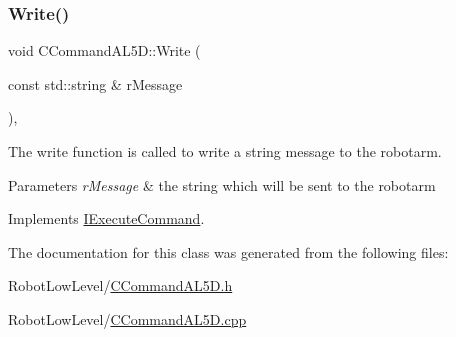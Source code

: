 \subsubsection{\texorpdfstring{Write()}{Write()}}
{\footnotesize\ttfamily void C\+Command\+A\+L5\+D\+::\+Write (\begin{DoxyParamCaption}\item[{const std\+::string \&}]{r\+Message }\end{DoxyParamCaption})\hspace{0.3cm}{\ttfamily [override]}, {\ttfamily [virtual]}}



The write function is called to write a string message to the robotarm. 


\begin{DoxyParams}{Parameters}
{\em r\+Message} & the string which will be sent to the robotarm \\
\hline
\end{DoxyParams}


Implements \hyperlink{classIExecuteCommand_a266571b3fc97e79be6e00b0df4c5a4ac}{I\+Execute\+Command}.



The documentation for this class was generated from the following files\+:\begin{DoxyCompactItemize}
\item 
Robot\+Low\+Level/\hyperlink{CCommandAL5D_8h}{C\+Command\+A\+L5\+D.\+h}\item 
Robot\+Low\+Level/\hyperlink{CCommandAL5D_8cpp}{C\+Command\+A\+L5\+D.\+cpp}\end{DoxyCompactItemize}
